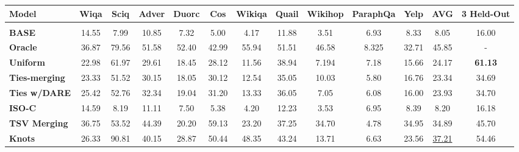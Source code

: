 \begin{table}[h]
\small
\centering
\begin{adjustbox}
{width=1.0\textwidth}
\begin{tabular}{l|ccccccccccc|c} 
\Xhline{1.6pt}
\textbf{Model} & \textbf{Wiqa} & \textbf{Sciq} & \textbf{Adver} & \textbf{Duorc} & \textbf{Cos} & \textbf{Wikiqa} & \textbf{Quail} & \textbf{Wikihop} & \textbf{ParaphQa} & \textbf{Yelp} & \multicolumn{1}{c}{\textbf{AVG}} & \textbf{3 Held-Out} \\
\midrule

\rowcolor{lightgray}\multicolumn{13}{c}{\textbf{Phi-3 (3B) with LoRA library }} \\
\textbf{BASE} & 14.55 & 7.99 & 10.85 & 7.32 & 5.00 & 4.17 & 11.88 & 3.51 & 6.93 & 8.33 & \cellcolor[HTML]{FDE9E8} 8.05 & \cellcolor[HTML]{FDE9E8}  16.00 \\ 
\textbf{Oracle} & 36.87 & 79.56 & 51.58 & 52.40 & 42.99 & 55.94 & 51.51 & 46.58 & 8.325 & 32.71 & \cellcolor[HTML]{FDE9E8}45.85 & \cellcolor[HTML]{FDE9E8}- \\

\midrule
\textbf{Uniform} & 22.98 & 61.97 & 29.61 & 18.45 & 28.12 & 11.56 & 38.94 & 7.194  & 7.18 & 15.66  & \cellcolor[HTML]{FDE9E8}24.17 & \cellcolor[HTML]{FDE9E8}\textbf{61.13}\\

\textbf{Ties-merging} & 23.33 & 51.52 & 30.15 & 18.05 & 30.12 & 12.54 & 35.05 & 10.03 & 5.80 & 16.76 & \cellcolor[HTML]{FDE9E8}23.34 & \cellcolor[HTML]{FDE9E8}34.69\\

\textbf{Ties w/DARE} & 25.42 & 52.76 & 32.34 & 19.04 & 31.20 & 13.33 & 36.05 & 7.05 & 6.08 & 16.00 & \cellcolor[HTML]{FDE9E8}23.93 & \cellcolor[HTML]{FDE9E8}34.70\\

\textbf{ISO-C} & 14.59 & 8.19 & 11.11 & 7.50 & 5.38 & 4.20 & 12.23 & 3.53 & 6.95 & 8.39 & \cellcolor[HTML]{FDE9E8}8.20 & \cellcolor[HTML]{FDE9E8}16.18\\
\textbf{TSV Merging} & 36.75 & 53.52 & 44.39 & 20.20 & 59.13 & 23.20& 37.25 & 34.70 & 4.78 & 34.95 & \cellcolor[HTML]{FDE9E8}34.89 & \cellcolor[HTML]{FDE9E8}45.70\\
\textbf{Knots} & 26.33 & 90.81 & 40.15 & 28.87 & 50.44 & 48.35 & 43.24 & 13.71 & 6.63 & 23.56 & \cellcolor[HTML]{FDE9E8}\underline{37.21} & \cellcolor[HTML]{FDE9E8}54.46\\


\end{tabular}
\end{adjustbox}
\end{table}
